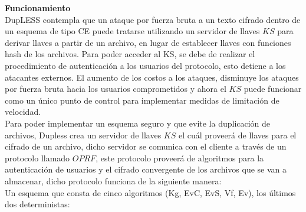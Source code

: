 \textbf{Funcionamiento}\\

DupLESS contempla que un ataque por fuerza bruta a un texto cifrado dentro de un esquema de tipo CE puede tratarse utilizando un servidor de llaves $KS$ para derivar llaves a partir de un archivo, en lugar de establecer llaves con funciones hash de los archivos. Para poder acceder al KS, se debe de realizar el procedimiento de autenticación a los usuarios del protocolo, esto detiene a los atacantes externos. El aumento de los costos a los ataques, disminuye los ataques por fuerza bruta hacia los usuarios comprometidos y ahora el $KS$ puede funcionar como un único punto de control para implementar medidas de limitación de velocidad. \\

Para poder implementar un esquema seguro y que evite la duplicación de archivos, Dupless crea un servidor de llaves $KS$ el cuál proveerá de llaves para el cifrado de un archivo, dicho servidor se comunica con el cliente a través de un protocolo llamado $OPRF$, este protocolo proveerá de algoritmos para la autenticación de usuarios y el cifrado convergente de los archivos que se van a almacenar, dicho protocolo funciona de la siguiente manera: \\ 

Un esquema que consta de cinco algoritmos (Kg, EvC, EvS, Vf, Ev), los últimos dos deterministas: 

